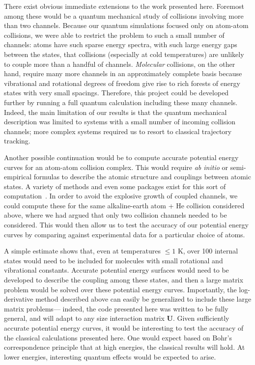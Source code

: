 \documentclass[%
 reprint,
 amsmath,amssymb,
 aps,
 nofootinbib
]{revtex4-1}
\begin{document}
There exist obvious immediate extensions to the work presented here. Foremost among these would be a quantum mechanical study of collisions involving more than two channels. Because our quantum simulations focused only on atom-atom collisions, we were able to restrict the problem to such a small number of channels: atoms have such sparse energy spectra, with such large energy gaps between the states, that collisions (especially at cold temperatures) are unlikely to couple more than a handful of channels. \textit{Molecular} collisions, on the other hand, require many more channels in an approximately complete basis because vibrational and rotational degrees of freedom give rise to rich forests of energy states with very small spacings. Therefore, this project could be developed further by running a full quantum calculation including these many channels. Indeed, the main limitation of our results is that the quantum mechanical description was limited to systems with a small number of incoming collision channels; more complex systems required us to resort to classical trajectory tracking.

Another possible continuation would be to compute accurate potential energy curves for an atom-atom collision complex. This would require \textit{ab initio} or semi-empirical formulas to describe the atomic structure and couplings between atomic states. A variety of methods and even some packages exist for this sort of computation~\cite{MOLPRO,Safronova}. In order to avoid the explosive growth of coupled channels, we could compute these for the same alkaline-earth atom + He collision considered above, where we had argued that only two collision channels needed to be considered. This would then allow us to test the accuracy of our potential energy curves by comparing against experimental data for a particular choice of atoms.

A simple estimate shows that, even at temperatures $\leq 1$ K, over 100 internal states would need to be included for molecules with small rotational and vibrational constants. Accurate potential energy surfaces would need to be developed to describe the coupling among these states, and then a large matrix problem would be solved over these potential energy curves. Importantly, the log-derivative method described above can easily be generalized to include these large matrix problems--- indeed, the code presented here was written to be fully general, and will adapt to any size interaction matrix $\mathbf{U}$. Given sufficiently accurate potential energy curves, it would be interesting to test the accuracy of the classical calculations presented here. One would expect based on Bohr's correspondence principle that at high energies, the classical results will hold. At lower energies, interesting quantum effects would be expected to arise. 
\end{document}
